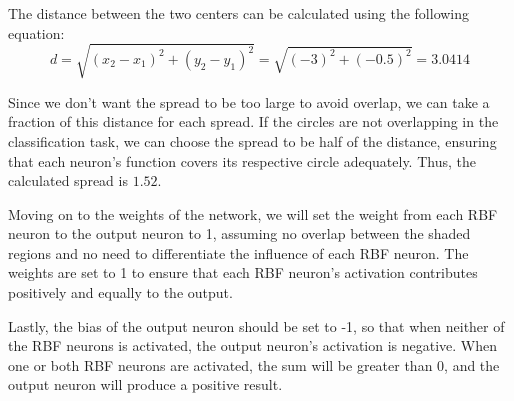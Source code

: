 The distance between the two centers can be calculated using the following equation:
\[
d = \sqrt{\left(x_2 - x_1\right)^2 + \left(y	_2 - y_1\right)^2 } = \sqrt{\left(-3\right)^2 + \left(-0.5\right)^2 } = 3.0414
\]

Since we don't want the spread to be too large to avoid overlap, we can take a fraction of this distance for each spread. If the circles are not overlapping in the classification task, we can choose the spread to be half of the distance, ensuring that each neuron's function covers its respective circle adequately.
Thus, the calculated spread is $1.52$.

Moving on to the weights of the network, we will set the weight from each RBF neuron to the output neuron to 1, assuming no overlap between the shaded regions and no need to differentiate the influence of each RBF neuron.
The weights are set to 1 to ensure that each RBF neuron's activation contributes positively and equally to the output.

Lastly, the bias of the output neuron should be set to -1, so that when neither of the RBF neurons is activated, the output neuron's activation is negative. When one or both RBF neurons are activated, the sum will be greater than 0, and the output neuron will produce a positive result.